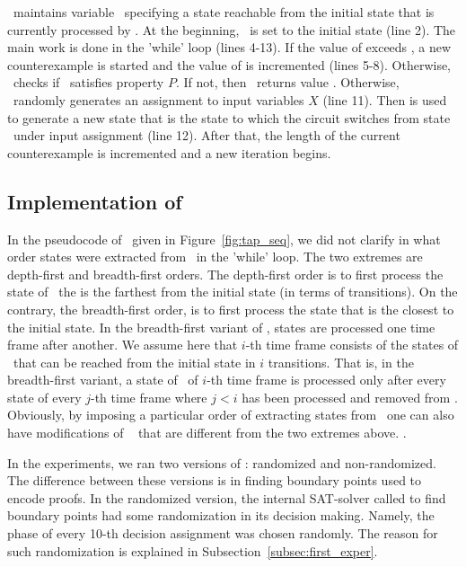 \Rnd~maintains variable \Curr~specifying a state reachable from the initial state
that is  currently processed by \Rnd. At the beginning, \Curr~is set to the initial state (line 2).
The main work is done in the 'while' loop (lines 4-13). If the value of  
exceeds , a new counterexample is started  and the value
of  is incremented (lines 5-8). Otherwise, \Rnd~checks if \Curr~satisfies property $P$.
If not, then  \Rnd~returns value .
Otherwise, \Rnd~randomly generates an assignment
 to input variables $X$ (line 11). Then  is used to generate a new state
that is the state to which the circuit switches from state \Curr~under input assignment 
(line 12). After that, the length of the current counterexample is incremented and a new iteration begins.
\subsection{Implementation of \TS}
\label{subsec:impl_tap_seq}
In the pseudocode of \TS~given in Figure~\ref{fig:tap_seq}, we did not clarify in what order states were extracted
from \Acts~in the 'while' loop. The two extremes are  depth-first and breadth-first orders. The depth-first order is to
 first process the state of \Acts~the is the farthest
from the initial state (in terms of transitions).  On the contrary, the breadth-first order, is to first process the state that is the
closest to the initial state. In the breadth-first variant of \TS, states are processed  one time frame after another. We assume here
that $i$-th time frame consists of the states of \All~that can be reached from the initial state in $i$ transitions.
That is, in the breadth-first variant, a state of \Acts~of $i$-th time frame is processed only after every state
of every $j$-th time frame where $j < i$ has been processed and removed from \Acts.
Obviously, by imposing a particular order of extracting states from \Acts~one can also have modifications of \TS~ that are different
from the two extremes above. .


In the experiments, we ran two versions of \TS: randomized and non-randomized. The difference between these versions is in finding
boundary points used to encode proofs. In the randomized version, the internal SAT-solver called  to find boundary points
had some randomization in its decision making. Namely, the phase of every 10-th decision assignment was chosen randomly. 
The reason for such randomization is explained in Subsection~\ref{subsec:first_exper}.
